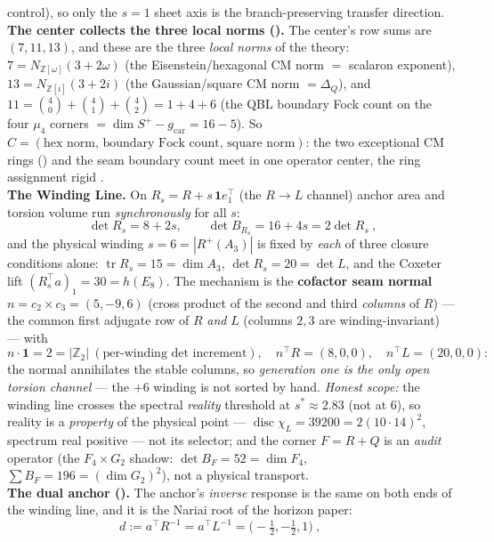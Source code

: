 \documentclass[11pt,a4paper]{article}
\newcommand{\gcar}{g_{\mathrm{car}}}
\newcommand{\Z}{\mathbb{Z}}
\theoremstyle{definition}
\begin{document}
\begin{winbox}
control), so only the $s{=}1$ sheet axis is the branch-preserving transfer direction.
\smallskip\\
\noindent\textbf{The center collects the three local norms ().} The
center's row sums are $(7,11,13)$, and these are the three \emph{local norms} of the theory:
$7=N_{\mathbb Z[\omega]}(3{+}2\omega)$ (the Eisenstein/hexagonal CM norm $=$ scalaron exponent),
$13=N_{\mathbb Z[i]}(3{+}2i)$ (the Gaussian/square CM norm $=\Delta_Q$), and
$11=\binom40{+}\binom41{+}\binom42=1{+}4{+}6$ (the QBL boundary Fock count on the four $\mu_4$ corners
$=\dim S^+{-}\gcar=16{-}5$). So $C=(\text{hex norm},\,\text{boundary Fock count},\,\text{square norm})$: the
two exceptional CM rings () and the seam boundary count meet in one operator
center, the ring assignment rigid \mE.
\smallskip\\
\noindent\textbf{The Winding Line.} On $R_s=R+s\,\mathbf 1e_1^\top$ (the $R\to L$ channel) anchor area and
torsion volume run \emph{synchronously} for all $s$:
\[
  \boxed{\ \det R_s=8+2s,\qquad \det B_{R_s}=16+4s=2\det R_s\ },
\]
and the physical winding $s=6=|R^+(A_3)|$ is fixed by \emph{each} of three closure conditions alone:
$\operatorname{tr}R_s=15=\dim A_3$, $\det R_s=20=\det L$, and the Coxeter lift $(R_s^\top a)_1=30=h(E_8)$.
The mechanism is the \textbf{cofactor seam normal} $n=c_2{\times}c_3=(5,-9,6)$ (cross product of the
second and third \emph{columns} of $R$) --- the common first adjugate row of $R$ \emph{and} $L$ (columns
$2,3$ are winding-invariant) --- with
\[
  n\cdot\mathbf 1=2=|\Z_2|\ (\text{per-winding det increment}),\quad
  n^\top R=(8,0,0),\quad n^\top L=(20,0,0):
\]
the normal annihilates the stable columns, so \emph{generation one is the only open torsion channel} ---
the $+6$ winding is not sorted by hand. \emph{Honest scope:} the winding line crosses the spectral
\emph{reality} threshold at $s^*\!\approx\!2.83$ (not at $6$), so reality is a \emph{property} of the
physical point --- $\operatorname{disc}\chi_L=39200=2(10\cdot14)^2$, spectrum real positive --- not its
selector; and the corner $F=R{+}Q$ is an \emph{audit} operator (the $F_4{\times}G_2$ shadow:
$\det B_F=52=\dim F_4$, $\sum B_F=196=(\dim G_2)^2$), not a physical transport.
\smallskip\\
\noindent\textbf{The dual anchor ().} The anchor's \emph{inverse} response is the
same on both ends of the winding line, and it is the Nariai root of the horizon paper:
\[
  \boxed{\ d:=a^\top R^{-1}=a^\top L^{-1}=\bigl(-\tfrac12,-\tfrac12,1\bigr)\ },\qquad
\]
\end{winbox}
\end{document}
